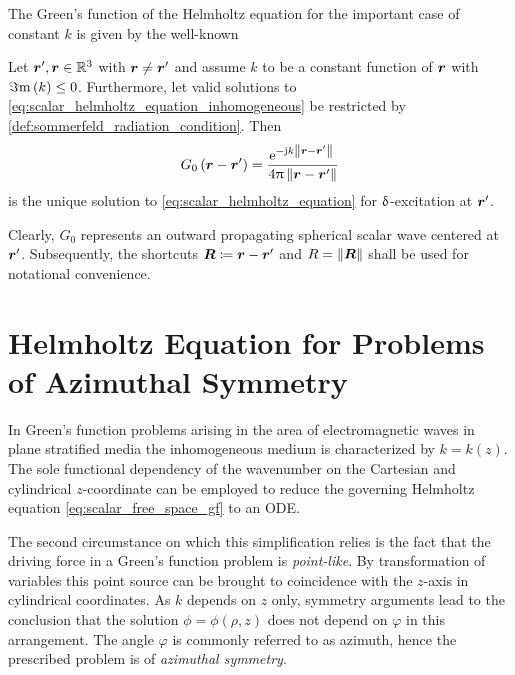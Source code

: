 The Green's function of the Helmholtz equation for the important case of
constant $k$ is given by the well-known \cite{Jackson2013}
\begin{corollary}\label{coll:free_space_gf}
	Let $\rsrc, \robs \in \R^3$ with $\robs \neq \rsrc$ and assume
	$k$ to be a constant function of $\robs$ with $\Im\mathrm{m}\left(k\right) \leq 0$.
	Furthermore, let valid solutions to
	\eqref{eq:scalar_helmholtz_equation_inhomogeneous} be restricted by
	\cref{def:sommerfeld_radiation_condition}.
	Then
	\begin{equation}\label{eq:scalar_free_space_gf}
		G_0 \left( \rdiff \right) =
		\frac{\exp{-\im k \rdiffNorm}}{4\pi \rdiffNorm}
	\end{equation}
	is the unique solution to \eqref{eq:scalar_helmholtz_equation} for
	$\operatorname{\updelta}$-excitation at $\rsrc$.
\end{corollary}

Clearly, $G_0$ represents an outward propagating spherical scalar wave 
centered at $\rsrc$.
Subsequently, the shortcuts $\rdiffSymbol \coloneqq \rdiff$ and
$\rdiffNormSymbol = \norm{\pvec{R}}$ shall be used for notational convenience.








\section{Helmholtz Equation for Problems of Azimuthal Symmetry}
\label{sec:helmholtz_eq_az_symmetry}

In Green's function problems arising in the area of electromagnetic waves
in plane stratified media the inhomogeneous medium is characterized by
$k = k\left(z\right)$.
The sole functional dependency of the wavenumber on the Cartesian and cylindrical 
$z$-coordinate can be employed to reduce the governing Helmholtz
equation \eqref{eq:scalar_free_space_gf} to an \ac{ODE}.

The second circumstance on which this simplification relies is the fact that 
the driving force in a Green's function problem is \emph{point-like}.
By transformation of variables this point source can be brought to
coincidence with the $z$-axis in cylindrical coordinates.
As $k$ depends on $z$ only, symmetry arguments lead to the conclusion that
the solution $\phi = \phi \left(\rho, z\right)$ does not depend on $\varphi$
in this arrangement.
The angle $\varphi$ is commonly referred to as azimuth, hence the prescribed
problem is of \emph{azimuthal symmetry}.

